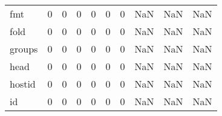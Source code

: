 \begin{longtable}{lrrrrrrrrr}
fmt       &                                                  0 &                                                  0 &                                                  0 &                                                  0 &                                                  0 &                                                  0 &                                                NaN &                                    NaN &                                  NaN \\
fold      &                                                  0 &                                                  0 &                                                  0 &                                                  0 &                                                  0 &                                                  0 &                                                NaN &                                    NaN &                                  NaN \\
groups    &                                                  0 &                                                  0 &                                                  0 &                                                  0 &                                                  0 &                                                  0 &                                                NaN &                                    NaN &                                  NaN \\
head      &                                                  0 &                                                  0 &                                                  0 &                                                  0 &                                                  0 &                                                  0 &                                                NaN &                                    NaN &                                  NaN \\
hostid    &                                                  0 &                                                  0 &                                                  0 &                                                  0 &                                                  0 &                                                  0 &                                                NaN &                                    NaN &                                  NaN \\
id        &                                                  0 &                                                  0 &                                                  0 &                                                  0 &                                                  0 &                                                  0 &                                                NaN &                                    NaN &                                  NaN \\

\end{longtable}
